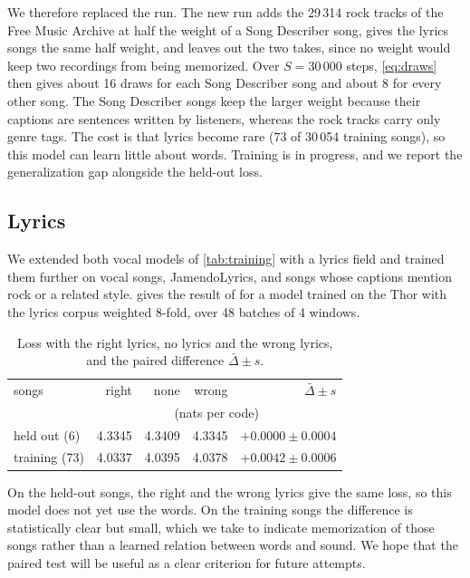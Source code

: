 We therefore replaced the run. The new run adds the 29\,314 rock tracks of the
Free Music Archive \cite{defferrard2017fma} at half the weight of a Song
Describer song, gives the lyrics songs the same half weight, and leaves out the
two takes, since no weight would keep two recordings from being memorized.
Over $S = 30\,000$ steps, \cref{eq:draws} then gives about 16 draws for each
Song Describer song and about 8 for every other song. The Song Describer songs
keep the larger weight because their captions are sentences written by
listeners, whereas the rock tracks carry only genre tags. The cost is that
lyrics become rare (73 of 30\,054 training songs), so this model can learn
little about words. Training is in progress, and we report the generalization
gap alongside the held-out loss.

\subsection{Lyrics}

We extended both vocal models of \cref{tab:training} with a lyrics field and
trained them further on vocal songs, JamendoLyrics, and songs whose captions
mention rock or a related style.  gives the result of
 for a model trained on the Thor with the lyrics corpus
weighted 8-fold, over 48 batches of 4 windows.

\begin{table}[htbp]
\centering
\caption{Loss with the right lyrics, no lyrics and the wrong lyrics, and the
paired difference $\bar\Delta \pm s$.}
\label{tab:lyrics}
\small
\begin{tabular}{lrrrr}
\toprule
songs & right & none & wrong & $\bar\Delta \pm s$ \\
 & \multicolumn{4}{c}{(nats per code)} \\
\midrule
held out (6) & 4.3345 & 4.3409 & 4.3345 & $+0.0000 \pm 0.0004$ \\
training (73) & 4.0337 & 4.0395 & 4.0378 & $+0.0042 \pm 0.0006$ \\
\bottomrule
\end{tabular}
\end{table}

On the held-out songs, the right and the wrong lyrics give the same loss, so
this model does not yet use the words. On the training songs the difference is
statistically clear but small, which we take to indicate memorization of those
songs rather than a learned relation between words and sound. We hope that the
paired test will be useful as a clear criterion for future attempts.

